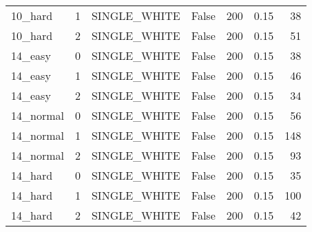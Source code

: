 \begin{tabular}{lrllrrr}
 10\_hard       &              1 & SINGLE\_WHITE    & False           &          200 &   0.15 &              38 \\
 10\_hard       &              2 & SINGLE\_WHITE    & False           &          200 &   0.15 &              51 \\
 14\_easy       &              0 & SINGLE\_WHITE    & False           &          200 &   0.15 &              38 \\
 14\_easy       &              1 & SINGLE\_WHITE    & False           &          200 &   0.15 &              46 \\
 14\_easy       &              2 & SINGLE\_WHITE    & False           &          200 &   0.15 &              34 \\
 14\_normal     &              0 & SINGLE\_WHITE    & False           &          200 &   0.15 &              56 \\
 14\_normal     &              1 & SINGLE\_WHITE    & False           &          200 &   0.15 &             148 \\
 14\_normal     &              2 & SINGLE\_WHITE    & False           &          200 &   0.15 &              93 \\
 14\_hard       &              0 & SINGLE\_WHITE    & False           &          200 &   0.15 &              35 \\
 14\_hard       &              1 & SINGLE\_WHITE    & False           &          200 &   0.15 &             100 \\
 14\_hard       &              2 & SINGLE\_WHITE    & False           &          200 &   0.15 &              42 \\
\hline
\end{tabular}
